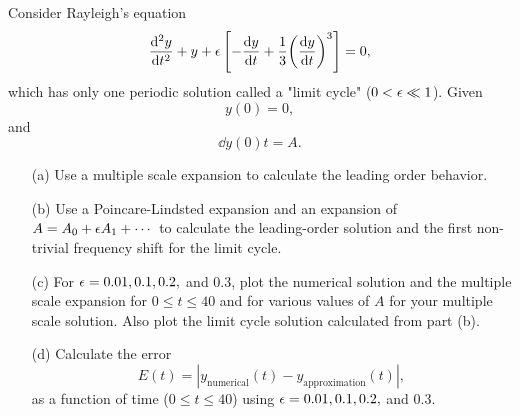 \documentclass[12pt]{report}
\begin{document}


\begin{problem}
    Consider Rayleigh's equation
    \[ 
        \frac{\mathrm{d}^{2} y}{\mathrm{d} t^{2}} + y + {\epsilon} \left[ - \frac{\mathrm{d} y}{\mathrm{d} t} + \frac{1}{3}{\left(\frac{\mathrm{d} y}{\mathrm{d} t}\right)}^3\right] = 0,
    \]
    which has only one periodic solution called a "limit cycle" ($0 < {\epsilon} \ll 1$). Given
    \[ 
        y(0) = 0,
    \]
    and
    \[ 
        \dd{y(0)}{t} = A.
    \]
    \begin{enumerate}
        \item [(a)]
        Use a multiple scale expansion to calculate the leading order behavior.


        \item [(b)]
        Use a Poincare-Lindsted expansion and an expansion of $A = A_0 + {\epsilon} A_1 + \cdots$ to calculate the
        leading-order solution and the first non-trivial frequency shift for the limit cycle.


        \item [(c)]
        For ${\epsilon} = 0.01, 0.1, 0.2,$ and $0.3$, plot the numerical solution and the multiple scale expansion for
        $0 \leq t \leq 40$ and for various values of $A$ for your multiple scale solution. Also plot the limit cycle
        solution calculated from part (b).

        \item [(d)]
        Calculate the error 
        \[ 
            E(t) = |y_{\text{numerical}}(t) - y_{\text{approximation}}(t)|,
        \]
        as a function of time ($0 \leq t \leq 40$) using ${\epsilon} = 0.01, 0.1, 0.2,$ and $0.3$. 

    \end{enumerate}
\end{problem}
\end{document}
